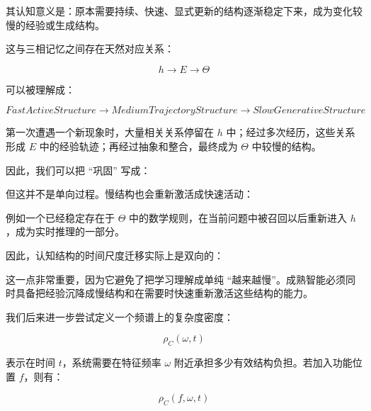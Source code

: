 其认知意义是：原本需要持续、快速、显式更新的结构逐渐稳定下来，成为变化较慢的经验或生成结构。

这与三相记忆之间存在天然对应关系：

\[
h
\rightarrow
E
\rightarrow
\Theta
\]

可以被理解成：

\[
FastActiveStructure
\rightarrow
MediumTrajectoryStructure
\rightarrow
SlowGenerativeStructure
\]

第一次遭遇一个新现象时，大量相关关系停留在 $h$ 中；经过多次经历，这些关系形成 $E$ 中的经验轨迹；再经过抽象和整合，最终成为 $\Theta$ 中较慢的结构。

因此，我们可以把 ``巩固'' 写成：

\begin{statementbox}
\centering
{}
\end{statementbox}

但这并不是单向过程。慢结构也会重新激活成快速活动：

\begin{statementbox}
\centering
{}
\end{statementbox}

例如一个已经稳定存在于 $\Theta$ 中的数学规则，在当前问题中被召回以后重新进入 $h$，成为实时推理的一部分。

因此，认知结构的时间尺度迁移实际上是双向的：

\begin{statementbox}
\centering
{}
\end{statementbox}

\begin{statementbox}
\centering
{}
\end{statementbox}

这一点非常重要，因为它避免了把学习理解成单纯 ``越来越慢''。成熟智能必须同时具备把经验沉降成慢结构和在需要时快速重新激活这些结构的能力。

我们后来进一步尝试定义一个频谱上的复杂度密度：

\[
\rho_C(\omega,t)
\]

表示在时间 $t$，系统需要在特征频率 $\omega$ 附近承担多少有效结构负担。若加入功能位置 $f$，则有：

\[
\rho_C(f,\omega,t)
\]

